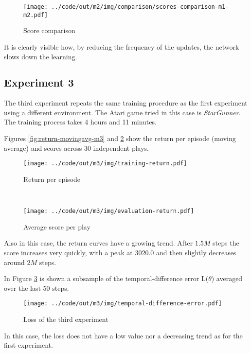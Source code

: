\documentclass[a4paper,12pt]{article} %
\begin{document}
	\begin{figure}[htb]
		\centering
		\texttt{[image: ../code/out/m2/img/comparison/scores-comparison-m1-m2.pdf]}	
		\caption{Score comparison}
		\label{fig:score-m1-m2}
	\end{figure}
	It is clearly visible how, by reducing the frequency of the updates, the network slows down the learning.
	
	\subsection*{Experiment 3}
	The third experiment repeats the same training procedure as the first experiment using a different environment. The Atari game tried in this case is \textit{StarGunner}. The training process takes 4 hours and 11 minutes.
	
	Figures \ref{fig:return-movingavg-m3} and \ref{fig:score-m3} show the return per episode (moving average) and scores across 30 independent plays.
	
	\begin{figure}[htb]
		\begin{minipage}[b]{.49\textwidth}
			\centering
			\texttt{[image: ../code/out/m3/img/training-return.pdf]}	
			\caption{Return per episode}
			\label{fig:return-movingavg-m3}
		\end{minipage}
		~
		\begin{minipage}[b]{.49\textwidth}
			\centering
			\texttt{[image: ../code/out/m3/img/evaluation-return.pdf]}	
			\caption{Average score per play}
			\label{fig:score-m3}
		\end{minipage}
	\end{figure}
	
	Also in this case, the return curves have a growing trend. After $1.5 M$ steps the score increases very quickly, with a peak at $3020.0$ and then slightly decreases around $2 M$ steps.
	\bigskip
	
	In Figure \ref{fig:loss-m3} is shown a subsample of the temporal-difference error L($\theta$) averaged over the last 50 steps.
	\begin{figure}[htb]
		\centering
		\texttt{[image: ../code/out/m3/img/temporal-difference-error.pdf]}	
		\caption{Loss of the third experiment}
		\label{fig:loss-m3}
	\end{figure} 
	
	In this case, the loss does not have a low value nor a decreasing trend as for the first experiment.
	
\end{document}
